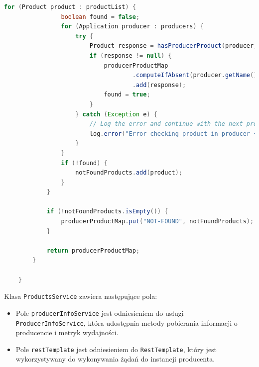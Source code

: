 \begin{lstlisting}[language=Java,caption= Kod klasy ProductsService, label=productsServiceCode]
            for (Product product : productList) {
                boolean found = false;
                for (Application producer : producers) {
                    try {
                        Product response = hasProducerProduct(producer, product);
                        if (response != null) {
                            producerProductMap
                                    .computeIfAbsent(producer.getName(), k -> new ArrayList<>())
                                    .add(response);
                            found = true;
                        }
                    } catch (Exception e) {
                        // Log the error and continue with the next producer
                        log.error("Error checking product in producer {}: {}", producer.getName(), e.getMessage());
                    }
                }
                if (!found) {
                    notFoundProducts.add(product);
                }
            }
    
            if (!notFoundProducts.isEmpty()) {
                producerProductMap.put("NOT-FOUND", notFoundProducts);
            }
    
            return producerProductMap;
        }
    
    }

\end{lstlisting}

Klasa \verb|ProductsService| zawiera następujące pola:
\begin{itemize}
    \item Pole \verb|producerInfoService| jest odniesieniem do usługi \verb|ProducerInfoService|, która udostępnia metody pobierania informacji o producencie i metryk wydajności.
    \item Pole \verb|restTemplate| jest odniesieniem do \verb|RestTemplate|, który jest wykorzystywany do wykonywania żądań  do instancji producenta.
\end{itemize}

